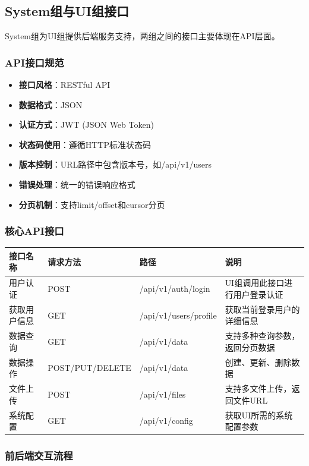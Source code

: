 \documentclass[a4paper,12pt]{article}
\begin{document}
\subsection{System组与UI组接口}

System组为UI组提供后端服务支持，两组之间的接口主要体现在API层面。

\subsubsection{API接口规范}

\begin{itemize}
  \item \textbf{接口风格}：RESTful API
  \item \textbf{数据格式}：JSON
  \item \textbf{认证方式}：JWT (JSON Web Token)
  \item \textbf{状态码使用}：遵循HTTP标准状态码
  \item \textbf{版本控制}：URL路径中包含版本号，如/api/v1/users
  \item \textbf{错误处理}：统一的错误响应格式
  \item \textbf{分页机制}：支持limit/offset和cursor分页
\end{itemize}

\subsubsection{核心API接口}

\begin{longtable}{|p{3cm}|p{2.5cm}|p{2.5cm}|p{7cm}|}
\hline
\textbf{接口名称} & \textbf{请求方法} & \textbf{路径} & \textbf{说明} \\
\hline
\endhead
用户认证 & POST & /api/v1/auth/login & UI组调用此接口进行用户登录认证 \\
\hline
获取用户信息 & GET & /api/v1/users/profile & 获取当前登录用户的详细信息 \\
\hline
数据查询 & GET & /api/v1/data & 支持多种查询参数，返回分页数据 \\
\hline
数据操作 & POST/PUT/DELETE & /api/v1/data & 创建、更新、删除数据 \\
\hline
文件上传 & POST & /api/v1/files & 支持多文件上传，返回文件URL \\
\hline
系统配置 & GET & /api/v1/config & 获取UI所需的系统配置参数 \\
\hline
\end{longtable}

\subsubsection{前后端交互流程}
\end{document}
